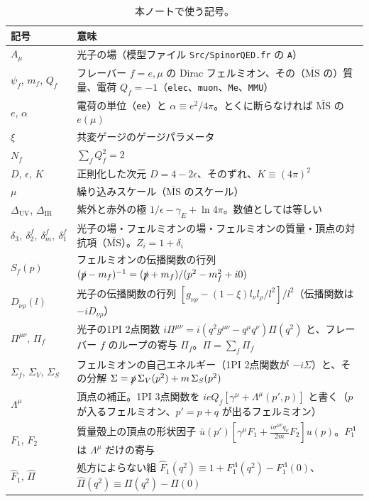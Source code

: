 \documentclass[a4paper,10pt]{ltjsarticle}
\newcommand{\MSbar}{\overline{\mathrm{MS}}}
\newcommand{\DUV}{\Delta_{\mathrm{UV}}}
\newcommand{\DIR}{\Delta_{\mathrm{IR}}}
\begin{document}
\begin{table}[tbp]
\centering\small
\caption{本ノートで使う記号。}
\label{tab:notation}
\begin{tabularx}{\linewidth}{>{\raggedright\arraybackslash}p{3.7cm}X}
\toprule
\textbf{記号} & \textbf{意味} \\
\midrule
$A_\mu$ & 光子の場（模型ファイル \texttt{Src/SpinorQED.fr} の \texttt{A}） \\
$\psi_f$, $m_f$, $Q_f$ & フレーバー $f=e,\mu$ の Dirac フェルミオン、その（$\MSbar$ の）質量、電荷 $Q_f=-1$（\texttt{elec}、\texttt{muon}、\texttt{Me}、\texttt{MMU}） \\
$e$, $\alpha$ & 電荷の単位（\texttt{ee}）と $\alpha\equiv e^2/4\pi$。とくに断らなければ $\MSbar$ の $e(\mu)$ \\
$\xi$ & 共変ゲージのゲージパラメータ \\
$N_f$ & $\sum_fQ_f^2=2$ \\
$D$, $\epsilon$, $K$ & 正則化した次元 $D=4-2\epsilon$、そのずれ、$K\equiv(4\pi)^2$ \\
$\mu$ & 繰り込みスケール（$\MSbar$ のスケール） \\
$\DUV$, $\DIR$ & 紫外と赤外の極 $1/\epsilon-\gamma_E+\ln4\pi$。数値としては等しい \\
$\delta_3,\ \delta_2^f,\ \delta_m^f,\ \delta_1^f$ & 光子の場・フェルミオンの場・フェルミオンの質量・頂点の対抗項（$\MSbar$）。$Z_i=1+\delta_i$ \\
$S_f(p)$ & フェルミオンの伝播関数の行列 $(\slashed p-m_f)^{-1}=(\slashed p+m_f)/(p^2-m_f^2+i0)$ \\
$D_{\nu\rho}(l)$ & 光子の伝播関数の行列 $[g_{\nu\rho}-(1-\xi)l_\nu l_\rho/l^2]/l^2$（伝播関数は $-iD_{\nu\rho}$） \\
$\Pi^{\mu\nu}$, $\Pi_f$ & 光子の1PI 2点関数 $i\Pi^{\mu\nu}=i(q^2g^{\mu\nu}-q^\mu q^\nu)\Pi(q^2)$ と、フレーバー $f$ のループの寄与 $\Pi_f$。$\Pi=\sum_f\Pi_f$ \\
$\Sigma_f$, $\Sigma_V$, $\Sigma_S$ & フェルミオンの自己エネルギー（1PI 2点関数が $-i\Sigma$）と、その分解 $\Sigma=\slashed p\,\Sigma_V(p^2)+m\,\Sigma_S(p^2)$ \\
$\Lambda^\mu$ & 頂点の補正。1PI 3点関数を $ieQ_f[\gamma^\mu+\Lambda^\mu(p',p)]$ と書く（$p$ が入るフェルミオン、$p'=p+q$ が出るフェルミオン） \\
$F_1$, $F_2$ & 質量殻上の頂点の形状因子 $\bar u(p')[\gamma^\mu F_1+\frac{i\sigma^{\mu\nu}q_\nu}{2m}F_2]u(p)$。$F_1^\Lambda$ は $\Lambda^\mu$ だけの寄与 \\
$\hat F_1$, $\hat\Pi$ & 処方によらない組 $\hat F_1(q^2)\equiv1+F_1^\Lambda(q^2)-F_1^\Lambda(0)$、$\hat\Pi(q^2)\equiv\Pi(q^2)-\Pi(0)$ \\

\end{tabularx}
\end{table}
\end{document}
